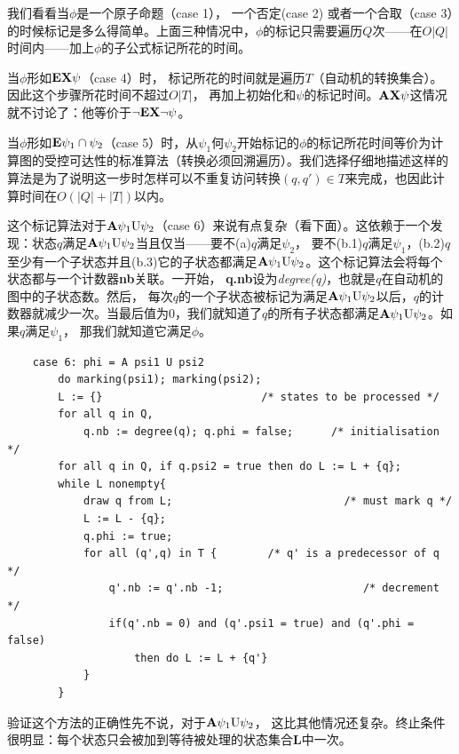 \documentclass{book}
\begin{document}
    我们看看当$\phi$是一个原子命题（case 1）， 一个否定(case 2) 或者一个合取（case 3）的时候标记是多么得简单。上面三种情况中，$\phi$的标记只需要遍历$Q$次——在$O|Q|$时间内——加上$\phi$的子公式标记所花的时间。

    当$\phi$形如$\text{\textbf{EX}}\psi$（case 4）时， 标记所花的时间就是遍历$T$（自动机的转换集合）。因此这个步骤所花时间不超过$O|T|$， 再加上初始化和$\psi$的标记时间。$\text{\textbf{AX}}\psi$这情况就不讨论了：他等价于$\neg\text{\textbf{EX}}\neg\psi$。

    当$\phi$形如$\text{\textbf{E}}\psi_1\cap\psi_2$（case 5）时，从$\psi_1$何$\psi_2$开始标记的$\phi$的标记所花时间等价为计算图的受控可达性的标准算法（转换必须回溯遍历）。我们选择仔细地描述这样的算法是为了说明这一步时怎样可以不重复访问转换$(q,q')\in T$来完成，也因此计算时间在$O(|Q|+|T|)$以内。

    这个标记算法对于$\text{\textbf{A}}\psi_1\text{U}\psi_2$（case 6）来说有点复杂（看下面）。这依赖于一个发现：状态$q$满足$\text{\textbf{A}}\psi_1\text{U}\psi_2$当且仅当——要不(a)$q$满足$\psi_2$， 要不(b.1)$q$满足$\psi_1$，(b.2)$q$至少有一个子状态并且(b.3)它的子状态都满足$\text{\textbf{A}}\psi_1\text{U}\psi_2$。这个标记算法会将每个状态都与一个计数器\textbf{nb}关联。一开始， \textbf{q.nb}设为{\itshape degree(q)}，也就是$q$在自动机的图中的子状态数。然后， 每次$q$的一个子状态被标记为满足$\text{\textbf{A}}\psi_1\text{U}\psi_2$以后，$q$的计数器就减少一次。当最后值为0，我们就知道了$q$的所有子状态都满足$\text{\textbf{A}}\psi_1\text{U}\psi_2$。如果$q$满足$\psi_1$， 那我们就知道它满足$\phi$。
     \lstset{language=C}
    \begin{lstlisting}
    case 6: phi = A psi1 U psi2
        do marking(psi1); marking(psi2);
        L := {}                         /* states to be processed */
        for all q in Q,
            q.nb := degree(q); q.phi = false;      /* initialisation */
        for all q in Q, if q.psi2 = true then do L := L + {q};
        while L nonempty{
            draw q from L;                           /* must mark q */
            L := L - {q};
            q.phi := true;
            for all (q',q) in T {        /* q' is a predecessor of q */
                q'.nb := q'.nb -1;                      /* decrement */
                if(q'.nb = 0) and (q'.psi1 = true) and (q'.phi = false)
                    then do L := L + {q'}
            }
        }
    \end{lstlisting}

    验证这个方法的正确性先不说，对于$\text{\textbf{A}}\psi_1\text{U}\psi_2$， 这比其他情况还复杂。终止条件很明显：每个状态只会被加到等待被处理的状态集合\textbf{L}中一次。
\end{document}
